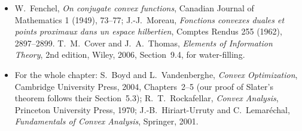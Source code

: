 \begin{itemize}
{probabilit\'es et de ses applications} IV.2 (1938), 105--113; M.~Sion, \emph{On general minimax theorems}, Pacific Journal of Mathematics 8 (1958), 171--176.
\item W.~Fenchel, \emph{On conjugate convex functions}, Canadian Journal of Mathematics 1 (1949), 73--77; J.-J.~Moreau, \emph{Fonctions convexes duales et points proximaux dans un espace
hilbertien}, Comptes Rendus 255 (1962), 2897--2899. T.~M.~Cover and J.~A.~Thomas, \emph{Elements of Information Theory}, 2nd edition, Wiley, 2006, Section~9.4, for water-filling.
\item For the whole chapter: S.~Boyd and L.~Vandenberghe, \emph{Convex Optimization}, Cambridge University Press, 2004, Chapters~2--5 (our proof of Slater's theorem follows
their Section~5.3); R.~T.~Rockafellar, \emph{Convex Analysis}, Princeton University Press, 1970; J.-B.~Hiriart-Urruty and C.~Lemar\'echal, \emph{Fundamentals of Convex Analysis},
Springer, 2001.
\end{itemize}
